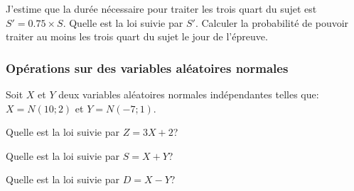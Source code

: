 \documentclass[a4paper,12pt]{scrartcl}
\begin{document}
J’estime que la durée nécessaire pour traiter les trois quart du sujet est $S' = 0.75\times S$. Quelle est la loi suivie par $S'$. Calculer la probabilité de pouvoir traiter au moins les trois quart du sujet le jour de l’épreuve. 


\subsubsection{Opérations sur des variables aléatoires normales}

Soit $X$ et $Y$ deux variables aléatoires normales indépendantes telles que: $X = N(10;2)$ et $Y = N(-7;1)$. 

Quelle est la loi suivie par $Z = 3X + 2$? 


Quelle est la loi suivie par $S = X + Y$? 


Quelle est la loi suivie par $D = X - Y$? 

\end{document}
